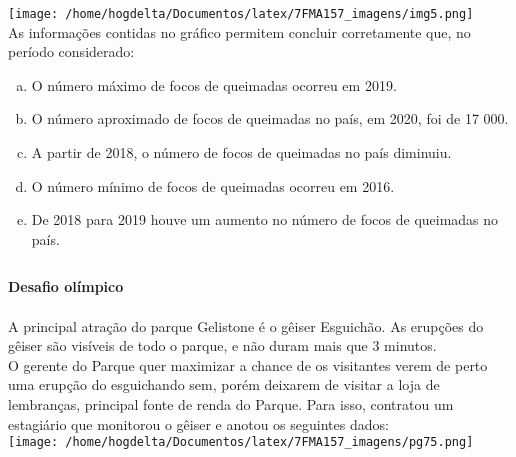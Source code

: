 \documentclass[a4paper,14pt]{article}
\begin{document}
\begin{multicols}{2}
\begin{enumerate}
            \texttt{[image: /home/hogdelta/Documentos/latex/7FMA157\_imagens/img5.png]} \\
            As informações contidas no gráfico permitem concluir corretamente que, no período considerado:
            \begin{enumerate}[a)]
            	\item O número máximo de focos de queimadas ocorreu em 2019.
            	\item O número aproximado de focos de queimadas no país, em 2020, foi de 17 000.
            	\item A partir de 2018, o número de focos de queimadas no país diminuiu.
            	\item O número mínimo de focos de queimadas ocorreu em 2016.
            	\item De 2018 para 2019 houve um aumento no número de focos de queimadas no país.
            \end{enumerate}
		\end{enumerate}
	$~$ \\ $~$ \\ $~$ \\ $~$ \\ $~$ \\ $~$ \\ $~$ \\ $~$ \\ $~$ \\ $~$ \\ $~$ \\ $~$ \\ $~$ \\ $~$ \\ $~$ \\ $~$ \\ $~$ \\ $~$ \\ $~$ \\ $~$ \\ $~$ \\
    \end{multicols}
	\newpage
	\noindent
	\textbf{Desafio olímpico} \\\\
	A principal atração do parque Gelistone é o gêiser Esguichão. As erupções do gêiser são visíveis de todo o parque, e não duram mais que 3 minutos.
\\
	O gerente do Parque quer maximizar a chance de os visitantes verem de perto uma erupção do esguichando sem, porém deixarem de visitar a loja de lembranças, principal fonte de renda do Parque. Para isso, contratou um estagiário que monitorou o gêiser e anotou os seguintes dados: \\
	\texttt{[image: /home/hogdelta/Documentos/latex/7FMA157\_imagens/pg75.png]} \\
	
\end{document}
